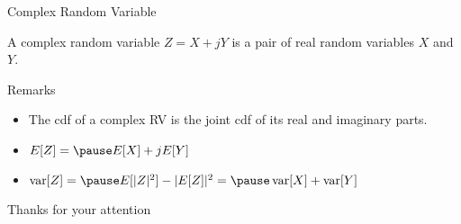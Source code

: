 \documentclass[t]{beamer}
\newcommand{\var}{\operatornamewithlimits{var}}
\begin{document}
\begin{frame}{Complex Random Variable}
  \footnotesize
  \pause
  \begin{definition}
    A complex random variable $Z=X+jY$ is a pair of real random variables $X$ and $Y$.
  \end{definition}
  \pause
  \begin{block}{Remarks}
    \begin{itemize}
      \item The cdf of a complex RV is the joint cdf of its real and imaginary parts.
      \pause
      \item $E[Z] = \pause E[X] + jE[Y]$
      \pause
      \item $\var[Z] = \pause E[\lvert Z \rvert^2] - \lvert E[Z] \rvert^2 = \pause \var[X] + \var[Y]$
    \end{itemize}
  \end{block}
  \normalsize
\end{frame}

\begin{frame}{}
\vfill
\begin{center}
Thanks for your attention
\end{center}
\vfill
\end{frame}
\end{document}
